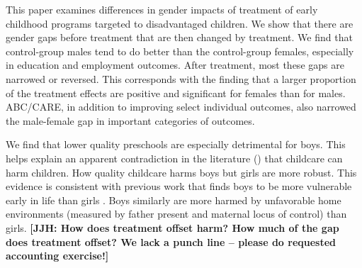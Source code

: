 This paper examines differences in gender impacts of treatment of early childhood programs targeted to disadvantaged children. We show that there are gender gaps before treatment that are then changed by treatment. We find that control-group males tend to do better than the control-group females, especially in education and employment outcomes. After treatment, most these gaps are narrowed or reversed. This corresponds with the finding that a larger proportion of the treatment effects are positive and significant for females than for males. ABC/CARE, in addition to improving select individual outcomes, also narrowed the male-female gap in important categories of outcomes.

We find that lower quality preschools are especially detrimental for boys. This helps explain an apparent contradiction in the literature (\citet{Baker_Gruber_etal_2008_JPE,Baker_Gruber_Milligan_2015_Noncog_Defects,Kottelenberg-Lehrer_2014_Gender-Effects}) that childcare can harm children. How quality childcare harms boys but girls are more robust. This evidence is consistent with previous work that finds boys to be more vulnerable early in life than girls \citep{golding2016psychology}. Boys similarly are more harmed by unfavorable home environments (measured by father present and maternal locus of control) than girls. \textbf{[JJH: How does treatment offset harm? How much of the gap does treatment offset? We lack a punch line -- please do requested accounting exercise!]}

